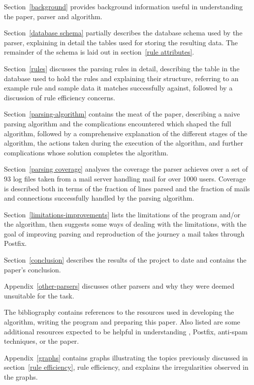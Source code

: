 \documentclass[a4paper,12pt,draft]{article}
\begin{document}
Section~\ref{background} provides background information useful in
understanding the paper, parser and algorithm.

Section~\ref{database schema} partially describes the database schema used
by the parser, explaining in detail the tables used for storing the
resulting data.  The remainder of the schema is laid out in
section~\ref{rule attributes}.

Section~\ref{rules} discusses the parsing rules in detail, describing the
table in the database used to hold the rules and explaining their
structure, referring to an example rule and sample data it matches
successfully against, followed by a discussion of rule efficiency concerns.

Section~\ref{parsing-algorithm} contains the meat of the paper, describing
a naive parsing algorithm and the complications encountered which shaped
the full algorithm, followed by a comprehensive explanation of the
different stages of the algorithm, the actions taken during the execution
of the algorithm, and further complications whose solution completes the
algorithm.

Section~\ref{parsing coverage} analyses the coverage the parser achieves
over a set of 93 log files taken from a mail server handling mail for over
1000 users.  Coverage is described both in terms of the fraction of lines
parsed and the fraction of mails and connections successfully handled by
the parsing algorithm.

Section~\ref{limitations-improvements} lists the limitations of the program
and/or the algorithm, then suggests some ways of dealing with the
limitations, with the goal of improving parsing and reproduction of the
journey a mail takes through Postfix.

Section~\ref{conclusion} describes the results of the project to date and
contains the paper's conclusion.

Appendix~\ref{other-parsers} discusses other parsers and why they were
deemed unsuitable for the task.

The bibliography contains references to the resources used in developing
the algorithm, writing the program and preparing this paper.  Also listed
are some additional resources expected to be helpful in understanding
\SMTP{}, Postfix, anti-spam techniques, or the paper.

Appendix~\ref{graphs} contains graphs illustrating the topics previously
discussed in section~\ref{rule efficiency}, rule efficiency, and explains
the irregularities observed in the graphs.
\end{document}
